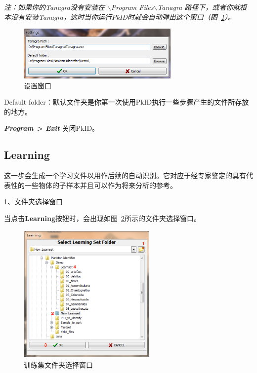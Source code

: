 \documentclass[12pt]{article}
\begin{document}
\textit{注：如果你的Tanagra没有安装在 $\backslash$Program Files$\backslash$Tanagra 路径下，或者你就根本没有安装Tanagra，这时当你运行PkID时就会自动弹出这个窗口（图~\ref{fig: Settings window}）。}

\begin{figure}[!ht]
\centering
\includegraphics[width=0.7\textwidth]{settingsWindow.png}
\caption{设置窗口}
\label{fig: Settings window}
\end{figure} 

Default folder：默认文件夹是你第一次使用PkID执行一些步骤产生的文件所存放的地方。

\textit{\textbf{Program > Exit}} 关闭PkID。

\subsection{Learning}

这一步会生成一个学习文件以用作后续的自动识别。它对应于经专家鉴定的具有代表性的一些物体的子样本并且可以作为将来分析的参考。

1、文件夹选择窗口

当点击\textbf{Learning}按钮时，会出现如图~\ref{fig: SelectLearningSetFolderWindow}所示的文件夹选择窗口。 

\begin{figure}[!ht]
\centering
\includegraphics[width=0.6\textwidth]{SelectLearningSetFolderWindow.eps}
\caption{训练集文件夹选择窗口}
\label{fig: SelectLearningSetFolderWindow}
\end{figure} 
\end{document}
